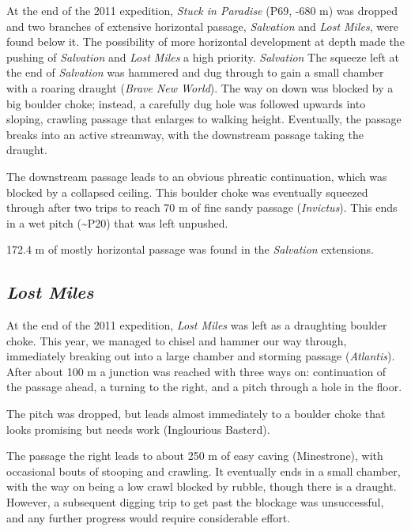 At the end of the 2011 expedition, \emph{Stuck in Paradise} (P69, -680
m) was dropped and two branches of extensive horizontal passage,
\emph{Salvation} and \emph{Lost Miles}, were found below it. The
possibility of more horizontal development at depth made the pushing of
\emph{Salvation} and \emph{Lost Miles} a high priority. \emph{Salvation}
The squeeze left at the end of \emph{Salvation} was hammered and dug
through to gain a small chamber with a roaring draught (\emph{Brave New
World}). The way on down was blocked by a big boulder choke; instead, a
carefully dug hole was followed upwards into sloping, crawling passage
that enlarges to walking height. Eventually, the passage breaks into an
active streamway, with the downstream passage taking the draught.

The downstream passage leads to an obvious phreatic continuation, which
was blocked by a collapsed ceiling. This boulder choke was eventually
squeezed through after two trips to reach 70 m of fine sandy passage
(\emph{Invictus}). This ends in a wet pitch (\textasciitilde P20) that
was left unpushed.

172.4 m of mostly horizontal passage was found in the \emph{Salvation}
extensions.

\hypertarget{lost-miles}{%
\subsection{\texorpdfstring{\emph{Lost
Miles}}{Lost Miles}}\label{lost-miles}}

At the end of the 2011 expedition, \emph{Lost Miles} was left as a
draughting boulder choke. This year, we managed to chisel and hammer our
way through, immediately breaking out into a large chamber and storming
passage (\emph{Atlantis}). After about 100 m a junction was reached with
three ways on: continuation of the passage ahead, a turning to the
right, and a pitch through a hole in the floor.

The pitch was dropped, but leads almost immediately to a boulder choke
that looks promising but needs work (Inglourious Basterd).

The passage the right leads to about 250 m of easy caving (Minestrone),
with occasional bouts of stooping and crawling. It eventually ends in a
small chamber, with the way on being a low crawl blocked by rubble,
though there is a draught. However, a subsequent digging trip to get
past the blockage was unsuccessful, and any further progress would
require considerable effort.

